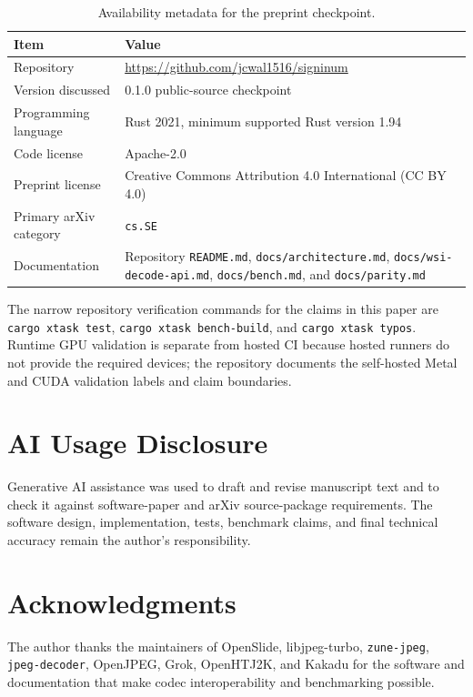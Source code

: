 \documentclass[11pt]{article}
\newcommand{\crate}[1]{\texttt{#1}}
\begin{document}
\begin{table}[t]
\centering
\caption{Availability metadata for the preprint checkpoint.}
\label{tab:availability}
\begin{tabularx}{\linewidth}{@{}lY@{}}
\toprule
Item & Value \\
\midrule
Repository & \url{https://github.com/jcwal1516/signinum} \\
Version discussed & 0.1.0 public-source checkpoint \\
Programming language & Rust 2021, minimum supported Rust version 1.94 \\
Code license & Apache-2.0 \\
Preprint license & Creative Commons Attribution 4.0 International (CC BY 4.0) \\
Primary arXiv category & \texttt{cs.SE} \\
Documentation & Repository \texttt{README.md}, \texttt{docs/architecture.md},
\texttt{docs/wsi-decode-api.md}, \texttt{docs/bench.md}, and
\texttt{docs/parity.md} \\
\bottomrule
\end{tabularx}
\end{table}

The narrow repository verification commands for the claims in this paper are
\texttt{cargo xtask test}, \texttt{cargo xtask bench-build}, and
\texttt{cargo xtask typos}. Runtime GPU validation is separate from hosted CI
because hosted runners do not provide the required devices; the repository
documents the self-hosted Metal and CUDA validation labels and claim
boundaries.

\section{AI Usage Disclosure}

Generative AI assistance was used to draft and revise manuscript text and to
check it against software-paper and arXiv source-package requirements. The
software design, implementation, tests, benchmark claims, and final technical
accuracy remain the author's responsibility.

\section{Acknowledgments}

The author thanks the maintainers of OpenSlide, libjpeg-turbo, \crate{zune-jpeg},
\crate{jpeg-decoder}, OpenJPEG, Grok, OpenHTJ2K, and Kakadu for the software
and documentation that make codec interoperability and benchmarking possible.



\end{document}
